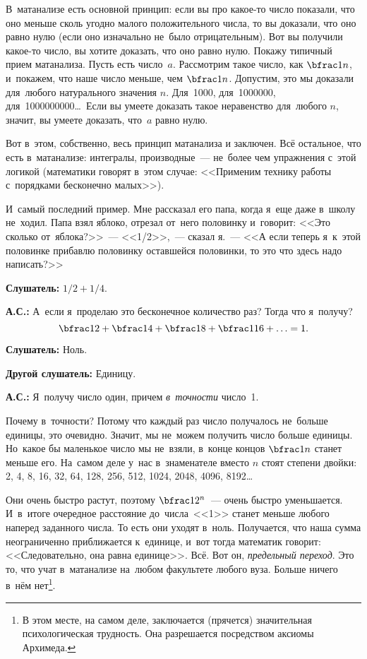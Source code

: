 В~матанализе есть основной принцип: если вы про какое-то число показали, что оно меньше сколь
угодно малого положительного числа, то вы доказали, что оно равно нулю (если оно изначально не~было
отрицательным). Вот вы получили какое-то число, вы хотите доказать, что оно равно нулю. Покажу
типичный прием матанализа. Пусть есть число~$a$. Рассмотрим такое число, как $\bfrac1n$, и~покажем, что
наше число меньше, чем $\bfrac1n$. Допустим, это мы доказали для~любого натурального значения $n$. Для~1000,
для~1000000, для~1000000000\ldots\ Если вы умеете доказать такое неравенство для~любого $n$, значит,
вы умеете доказать, что~$a$ равно нулю.

\pagebreak

Вот в~этом, собственно, весь принцип матанализа и заключен. Всё остальное, что есть в~матанализе: интегралы,
производные~--- не~более чем упражнения с~этой логикой (математики говорят в~этом случае:
<<Применим технику работы с~порядками бесконечно малых>>).

И~самый последний пример. Мне рассказал его папа, когда я~еще даже в~школу не~ходил. Папа взял
яблоко, отрезал от~него половинку и~говорит: <<Это сколько от~яблока?>>~--- <<1/2>>,~--- сказал я.~---
<<А если теперь я~к~этой половинке прибавлю половинку оставшейся половинки, то это что здесь надо
написать?>>


\textbf{Слушатель:} $1/2+1/4$.

\textbf{А.С.:} А~если я~проделаю это бесконечное количество раз? Тогда что я~получу?
$$
\bfrac12+\bfrac14+\bfrac18+\bfrac1{16}+\ldots=1.
$$

\textbf{Слушатель:} Ноль.

\textbf{Другой слушатель:} Единицу.

\textbf{А.С.:} Я~получу число один, причем \textit{в~точности} число~1.

Почему в~точности? Потому что каждый раз число получалось не~больше единицы, это очевидно. Значит,
мы не~можем получить число больше единицы. Но~какое бы маленькое число мы не~взяли, в~конце концов
$\bfrac1n$ станет меньше его. На~самом деле у~нас в~знаменателе вместо $n$ стоят степени двойки: 2, 4, 8, 16, 32,
64, 128, 256, 512, 1024, 2048, 4096, 8192\ldots

Они очень быстро растут, поэтому $\bfrac1{2^{n}}$~--- очень быстро уменьшается. И~в~итоге очередное расстояние
до~числа~<<1>> станет меньше любого наперед заданного числа. То есть они уходят в~ноль. Получается,
что наша сумма неограниченно приближается к~единице, и~вот тогда математик говорит:
<<Следовательно, она равна единице>>.
 Всё. Вот он, \textit{предельный переход}. Это то, что учат в~матанализе
на~любом факультете любого вуза. Больше ничего в~нём нет\footnote{В этом месте, на самом деле, заключается (прячется) значительная психологическая трудность. Она разрешается посредством аксиомы Архимеда.}.



